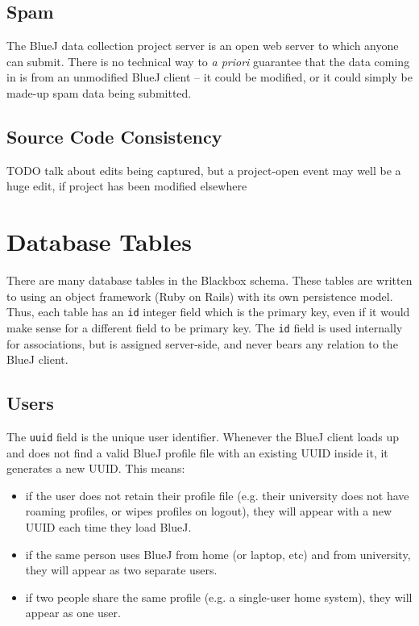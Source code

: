 \documentclass{book}
\begin{document}
\section{Spam}
\label{def:spam}

The BlueJ data collection project server is an open web server to which anyone
can submit.  There is no technical way to \textit{a priori} guarantee that the
data coming in is from an unmodified BlueJ client -- it could be modified, or
it could simply be made-up spam data being submitted.

\section{Source Code Consistency}

TODO talk about edits being captured, but a project-open event may well be a
huge edit, if project has been modified elsewhere

\chapter{Database Tables}

There are many database tables in the Blackbox schema.  These tables are
written to using an object framework (Ruby on Rails) with its own persistence
model.  Thus, each table has an \verb$id$ integer field which is the primary
key, even if it would make sense for a different field to be primary key.  The
\texttt{id} field is used internally for associations, but is assigned
server-side, and never bears any relation to the BlueJ client.

\section{Users}

The \texttt{uuid} field is the unique user identifier.  Whenever the BlueJ
client loads up and does not find a valid BlueJ profile file with an existing
UUID inside it, it generates a new UUID.  This means:

\begin{itemize}
\item if the user does not retain their profile file (e.g. their university
  does not have roaming profiles, or wipes profiles on logout), they will
  appear with a new UUID each time they load BlueJ.
\item if the same person uses BlueJ from home (or laptop, etc) and from
  university, they will appear as two separate users.
\item if two people share the same profile (e.g. a single-user home system),
  they will appear as one user.
\end{itemize}
\end{document}
